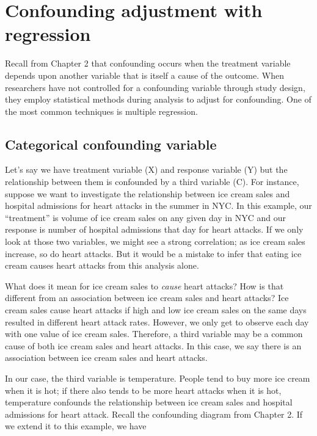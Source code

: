 \documentclass[]{book}
\begin{document}
\hypertarget{confounding-adjustment-with-regression}{%
\chapter{Confounding adjustment with regression}\label{confounding-adjustment-with-regression}}

Recall from Chapter 2 that confounding occurs when the treatment variable depends upon another variable that is itself a cause of the outcome. When researchers have not controlled for a confounding variable through study design, they employ statistical methods during analysis to adjust for confounding. One of the most common techniques is multiple regression.

\hypertarget{categorical-confounding-variable}{%
\section{Categorical confounding variable}\label{categorical-confounding-variable}}

Let's say we have treatment variable (X) and response variable (Y) but the relationship between them is confounded by a third variable (C). For instance, suppose we want to investigate the relationship between ice cream sales and hospital admissions for heart attacks in the summer in NYC. In this example, our ``treatment'' is volume of ice cream sales on any given day in NYC and our response is number of hospital admissions that day for heart attacks. If we only look at those two variables, we might see a strong correlation; as ice cream sales increase, so do heart attacks. But it would be a mistake to infer that eating ice cream causes heart attacks from this analysis alone.

What does it mean for ice cream sales to \emph{cause} heart attacks? How is that different from an association between ice cream sales and heart attacks? Ice cream sales cause heart attacks if high and low ice cream sales on the same days resulted in different heart attack rates. However, we only get to observe each day with one value of ice cream sales. Therefore, a third variable may be a common cause of both ice cream sales and heart attacks. In this case, we say there is an association between ice cream sales and heart attacks.

In our case, the third variable is temperature. People tend to buy more ice cream when it is hot; if there also tends to be more heart attacks when it is hot, temperature confounds the relationship between ice cream sales and hospital admissions for heart attack. Recall the confounding diagram from Chapter 2. If we extend it to this example, we have
\end{document}

